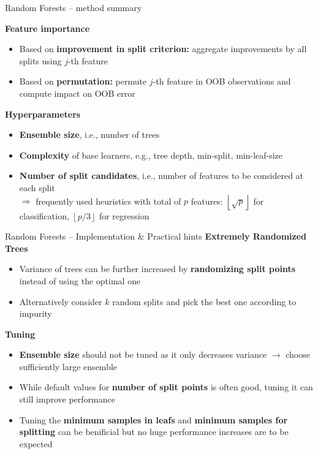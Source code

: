 \documentclass[11pt,compress,t,notes=noshow, xcolor=table]{beamer}
\newcommand{\highlight}[1]{\textcolor{hlcol}{\textbf{#1}}}
\begin{document}
\begin{frame2}{Random Forests -- method summary}

\highlight{Feature importance}

\begin{itemize}
  \item Based on \textbf{improvement in split criterion:} aggregate improvements 
  by all splits using $j$-th feature
  \item Based on \textbf{permutation:} permute $j$-th feature in 
  OOB observations and compute impact on OOB error
\end{itemize}


\highlight{Hyperparameters}

\begin{itemize}
  \item \textbf{Ensemble size}, i.e., number of trees
  \item \textbf{Complexity} of base learners, e.g., tree depth, min-split, min-leaf-size
  \item \textbf{Number of split candidates}, i.e., number of features to be considered at each split \\
  $\Rightarrow$ frequently used heuristics with total of $p$ features: 
  $\left \lfloor{\sqrt{p}}\right \rfloor$ for classification, $\left \lfloor{p/3}\right \rfloor$ for regression
\end{itemize}

\end{frame2}

\begin{frame2}{Random Forests -- Implementation \& Practical hints}
  \highlight{Extremely Randomized Trees}
\begin{itemize}
    \item Variance of trees can be further increased by \textbf{randomizing split points} instead of using the optimal one
    \item Alternatively consider $k$ random splits and pick the best one according to impurity 
\end{itemize}



\highlight{Tuning} 
\begin{itemize}
    \item \textbf{Ensemble size} should not be tuned as it only decreases variance $\longrightarrow$ choose sufficiently large ensemble
    \item While default values for \textbf{number of split points} is often good, tuning it can still improve performance
    \item Tuning the \textbf{minimum samples in leafs} and \textbf{minimum samples for splitting} can be benificial but no huge performance increases are to be expected 
\end{itemize}

\end{frame2}
\end{document}
